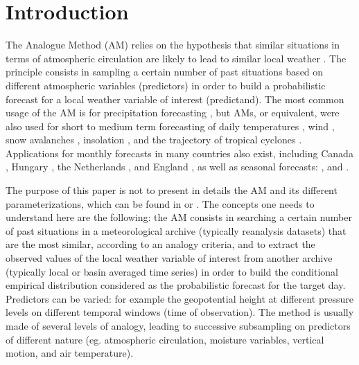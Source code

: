 \documentclass{ametsoc}
\begin{document}


\section{Introduction}
\label{section_intro}

The Analogue Method (AM) relies on the hypothesis that similar situations in terms of atmospheric circulation are likely to lead to similar local weather \citep{Lorenz1956, Lorenz1969, Duband1970, Bontron2005}. The principle consists in sampling a certain number of past situations based on different atmospheric variables (predictors) in order to build a probabilistic forecast for a local weather variable of interest (predictand). The most common usage of the AM is for precipitation forecasting \citep[eg.][]{Guilbaud1997, Bontron2005, Bliefernicht2010, Marty2012, Horton2012, Radanovics2013, BenDaoud2015}, but AMs, or equivalent, were also used for short to medium term forecasting of daily temperatures \citep{Radinovic1975, Woodcock1980, Kruizinga1983}, wind \citep{Gordon1987}, snow avalanches \citep{Obled1980, Bolognesi1993}, insolation \citep{Bois1981}, and the trajectory of tropical cyclones \citep{Keenan1981, Sievers2000, Fraedrich2003}. Applications for monthly forecasts in many countries also exist, including Canada \citep{Shabbar1986},  Hungary \citep{Toth1989}, the Netherlands \citep{Nap1981}, and England \citep{Murray1974}, as well as seasonal forecasts: \citet{Barnett1978}, \citet{Bergen1982} and \citet{Livezey1988}.

The purpose of this paper is not to present in details the AM and its different parameterizations, which can be found in \citet{Horton2016} or \citet{BenDaoud2015}. The concepts one needs to understand here are the following: the AM consists in searching a certain number of past situations in a meteorological archive (typically reanalysis datasets) that are the most similar, according to an analogy criteria, and to extract the observed values of the local weather variable of interest from another archive (typically local or basin averaged time series) in order to build the conditional empirical distribution considered as the probabilistic forecast for the target day. Predictors can be varied: for example the geopotential height at different pressure levels on different temporal windows (time of observation). The method is usually made of several levels of analogy, leading to successive subsampling on predictors of different nature (eg. atmospheric circulation, moisture variables, vertical motion, and air temperature).
\end{document}
